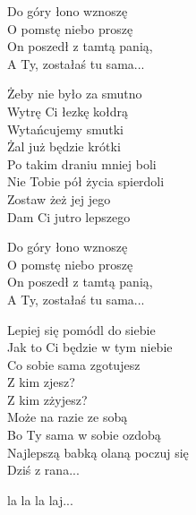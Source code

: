 \begin{text}
    Do góry łono wznoszę\\
    O pomstę niebo proszę\\
    On poszedł z tamtą panią,\\
    A Ty, zostałaś tu sama...

    Żeby nie było za smutno\\
    Wytrę Ci łezkę kołdrą\\
    Wytańcujemy smutki\\
    Żal już będzie krótki\\
    Po takim draniu mniej boli\\
    Nie Tobie pół życia spierdoli\\
    Zostaw żeż jej jego\\
    Dam Ci jutro lepszego

    Do góry łono wznoszę\\
    O pomstę niebo proszę\\
    On poszedł z tamtą panią,\\
    A Ty, zostałaś tu sama...

    Lepiej się pomódl do siebie\\
    Jak to Ci będzie w tym niebie\\
    Co sobie sama zgotujesz\\
    Z kim zjesz?\\
    Z kim zżyjesz?\\
    Może na razie ze sobą\\
    Bo Ty sama w sobie ozdobą\\
    Najlepszą babką olaną poczuj się\\
    Dziś z rana...

    la la la laj...
\end{text}
\begin{chord}

\end{chord}